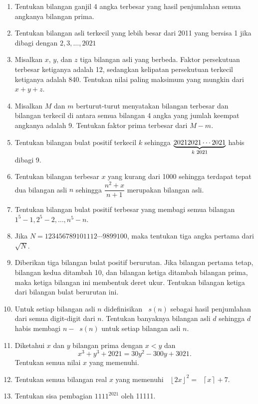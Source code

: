 \documentclass[12pt]{article}
\newcommand*\floor[1]{\mathop{}\!\left\lfloor{#1}\right\rfloor}
\newcommand*\ceil[1]{\mathop{}\!\left\lceil{#1}\right\rceil}
\newcommand*\func[2]{\mathop{}\!{#1}{\left({#2}\right)}}
\newcommand*\ubr[2]{\mathop{}\!\underbrace{#1}_{\text{$ {#2} $}}}
\newcommand*\ds[1]{\mathop{}\!\displaystyle{{#1}}}
\begin{document}
	\begin{enumerate}[leftmargin=*]
		\item Tentukan bilangan ganjil 4 angka terbesar yang hasil penjumlahan semua angkanya bilangan prima.
		\item Tentukan bilangan asli terkecil yang lebih besar dari 2011 yang bersisa 1 jika dibagi dengan $ 2, 3, \dots, 2021 $
		\item Misalkan $ x $, $ y $, dan $ z $ tiga bilangan asli yang berbeda. Faktor persekutuan terbesar ketiganya adalah 12, sedangkan kelipatan persekutuan terkecil ketiganya adalah 840. Tentukan nilai paling maksimum yang mungkin dari $ x + y + z $.
		\item Misalkan $ M $ dan $ m $ berturut-turut menyatakan bilangan terbesar dan bilangan terkecil di antara semua bilangan 4 angka yang jumlah keempat angkanya adalah 9. Tentukan faktor prima terbesar dari $ M - m $.
		\item Tentukan bilangan bulat positif terkecil $ k $ sehingga $ \ds{\ubr{20212021\cdots2021}{k \mbox{ 2021}}} $ habis dibagi 9.
		\item Tentukan bilangan terbesar $ x $ yang kurang dari 1000 sehingga terdapat tepat dua bilangan asli $ n $ sehingga $ \dfrac{n^{2} + x}{n + 1} $ merupakan bilangan asli.
		\item Tentukan bilangan bulat positif terbesar yang membagi semua bilangan $ 1^{5} - 1, 2^{5} - 2, \dots, n^{5} - n $.
		\item Jika $ N = 123456789101112 \cdots 9899100 $, maka tentukan tiga angka pertama dari $ \sqrt{N} $.
		\item Diberikan tiga bilangan bulat positif berurutan. Jika bilangan pertama tetap, bilangan kedua ditambah 10, dan bilangan ketiga ditambah bilangan prima, maka ketiga bilangan ini membentuk deret ukur. Tentukan bilangan ketiga dari bilangan bulat berurutan ini.
		\item Untuk setiap bilangan asli $ n $ didefinisikan $ \func{s}{n} $ sebagai hasil penjumlahan dari semua digit-digit dari $ n $. Tentukan banyaknya bilangan asli $ d $ sehingga $ d $ habis membagi $ n - \func{s}{n} $ untuk setiap bilangan asli $ n $.
		\item Diketahui $ x $ dan $ y $ bilangan prima dengan $ x < y $ dan
		\[ x^{3} + y^{3} + 2021 = 30y^{2} - 300y + 3021. \]
		Tentukan semua nilai $ x $ yang memenuhi.
		\item Tentukan semua bilangan real $ x $ yang memenuhi $ \floor{2x}^{2} = \ceil{x} + 7 $.
		\item Tentukan sisa pembagian $ 1111^{2021} $ oleh 11111.

\end{enumerate}
\end{document}
